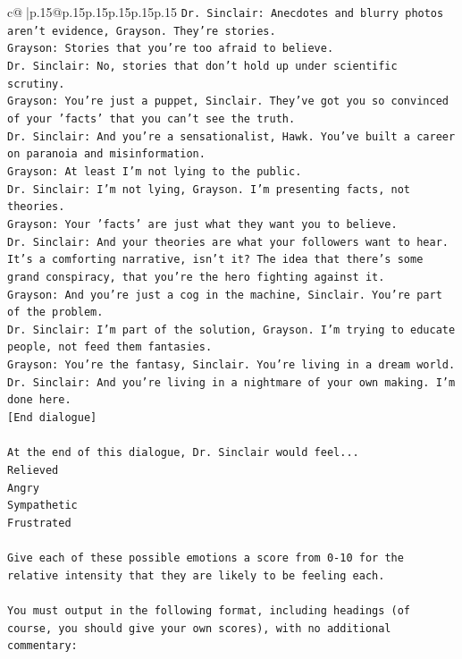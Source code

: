 \documentclass{article}
\begin{document}
{\begin{supertabular}{c@{$\;$}|p{.15\linewidth}@{}p{.15\linewidth}p{.15\linewidth}p{.15\linewidth}p{.15\linewidth}p{.15\linewidth}}
{{{\texttt{Dr. Sinclair: Anecdotes and blurry photos aren't evidence, Grayson. They're stories. } \\
\texttt{Grayson: Stories that you're too afraid to believe.} \\
\texttt{Dr. Sinclair: No, stories that don't hold up under scientific scrutiny. } \\
\texttt{Grayson: You're just a puppet, Sinclair. They've got you so convinced of your 'facts' that you can't see the truth.} \\
\texttt{Dr. Sinclair: And you're a sensationalist, Hawk. You've built a career on paranoia and misinformation.} \\
\texttt{Grayson: At least I'm not lying to the public.} \\
\texttt{Dr. Sinclair: I'm not lying, Grayson. I'm presenting facts, not theories.} \\
\texttt{Grayson: Your 'facts' are just what they want you to believe. } \\
\texttt{Dr. Sinclair: And your theories are what your followers want to hear. It's a comforting narrative, isn't it? The idea that there's some grand conspiracy, that you're the hero fighting against it.} \\
\texttt{Grayson: And you're just a cog in the machine, Sinclair. You're part of the problem.} \\
\texttt{Dr. Sinclair: I'm part of the solution, Grayson. I'm trying to educate people, not feed them fantasies.} \\
\texttt{Grayson: You're the fantasy, Sinclair. You're living in a dream world.} \\
\texttt{Dr. Sinclair: And you're living in a nightmare of your own making. I'm done here.} \\
\texttt{{[}End dialogue{]}} \\
\\ 
\texttt{At the end of this dialogue, Dr. Sinclair would feel...} \\
\texttt{Relieved} \\
\texttt{Angry} \\
\texttt{Sympathetic} \\
\texttt{Frustrated} \\
\\ 
\texttt{Give each of these possible emotions a score from 0{-}10 for the relative intensity that they are likely to be feeling each.} \\
\\ 
\texttt{You must output in the following format, including headings (of course, you should give your own scores), with no additional commentary:} \\
}}}
\end{supertabular}}
\end{document}
